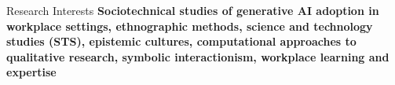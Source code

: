 \documentclass{resume}
\begin{document}
\fancyheadoffset[RO]{5em}
\fancyfootoffset[RO]{0cm}
\thispagestyle{firstpage}

\begin{rSection}{Research Interests}
    {\textbf{Sociotechnical studies of generative AI adoption in workplace settings, ethnographic methods, science and technology studies (STS), epistemic cultures, computational approaches to qualitative research, symbolic interactionism, workplace learning and expertise}}
\end{rSection}



\end{document}
